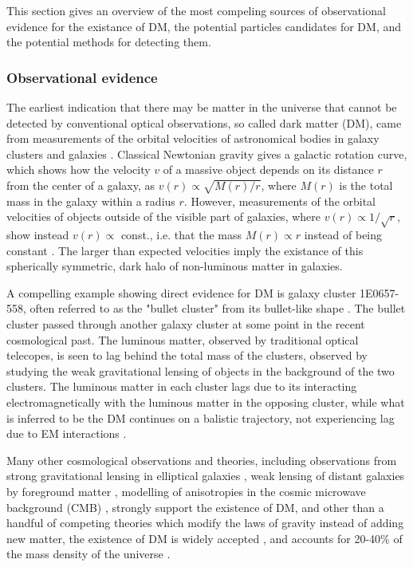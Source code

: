 This section gives an overview of the most compeling sources of observational evidence for the existance of DM, the potential particles candidates for DM, and the potential methods for detecting them.  

\subsubsection{Observational evidence}

The earliest indication that there may be matter in the universe that cannot be detected by conventional optical observations, so called dark matter (DM), came from measurements of the orbital velocities of astronomical bodies in galaxy clusters \cite{Kapteyn:1922zz, Zwicky:1937zza} and galaxies \cite{Rubin:1970zza, Rubin:1980zd}. Classical Newtonian gravity gives a galactic rotation curve, which shows how the velocity $v$ of a massive object depends on its distance $r$ from the center of a galaxy, as $v(r) \propto \sqrt{M(r)/r}$, where $M(r)$ is the total mass in the galaxy within a radius $r$. However, measurements of the orbital velocities of objects outside of the visible part of galaxies, where $v(r) \propto 1/\sqrt{r}$, show instead $v(r) \propto$ const., i.e. that the mass $M(r) \propto r$ instead of being constant \cite{Agashe:2014kda}. The larger than expected velocities imply the existance of this spherically symmetric, dark halo of non-luminous matter in galaxies. 

\indent A compelling example showing direct evidence for DM is galaxy cluster 1E0657-558, often referred to as the "bullet cluster" from its bullet-like shape \cite{Clowe:2003tk}. The bullet cluster passed through another galaxy cluster at some point in the recent cosmological past. The luminous matter, observed by traditional optical telecopes, is seen to lag behind the total mass of the clusters, observed by studying the weak gravitational lensing of objects in the background of the two clusters. The luminous matter in each cluster lags due to its interacting electromagnetically with the luminous matter in the opposing cluster, while what is inferred to be the DM continues on a balistic trajectory, not experiencing lag due to EM interactions \cite{Agashe:2014kda}. 

Many other cosmological observations and theories, including observations from strong gravitational lensing in elliptical galaxies \cite{Koopmans:2002qh}, weak lensing of distant galaxies by foreground matter \cite{Hoekstra:2002nf}, modelling of anisotropies in the cosmic microwave background (CMB) \cite{Hu:2001bc, Hu:1996qs}, strongly support the existence of DM, and other than a handful of competing theories which modify the laws of gravity instead of adding new matter, the existence of DM is widely accepted \cite{Bertone:2004pz}, and accounts for 20-40\% of the mass density of the universe \cite{Bergstrom:2000pn}.

